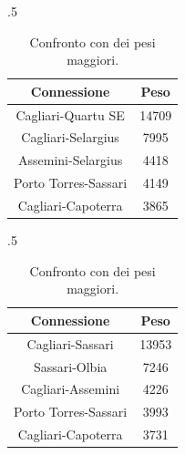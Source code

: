         \begin{table}[htb]
            \newcommand\dimTab{.5\linewidth}
            \newcommand\sepCol{\hspace{0.5em}}
            \newcommand\sepTab{\hspace{0em}}
            \centering
            \begin{subtable}{\dimTab}
                \centering
                \begin{tabular}{c@{\sepCol}c}
                    \hline
                    Connessione & Peso \\
                    \hline
                    Cagliari-Quartu SE & 14709 \\
                    Cagliari-Selargius & 7995 \\
                    Assemini-Selargius & 4418 \\
                    Porto Torres-Sassari & 4149 \\
                    Cagliari-Capoterra & 3865 \\
                    \hline
                \end{tabular}
                \caption{Pesi maggiori correnti.}
                \label{tabPesiCorrenti}
            \end{subtable}%
            \sepTab
            \begin{subtable}{\dimTab}
                \centering
                \begin{tabular}{c@{\sepCol}c}
                    \hline
                    Connessione & Peso \\
                    \hline
                    Cagliari-Sassari & 13953 \\
                    Sassari-Olbia & 7246 \\
                    Cagliari-Assemini & 4226 \\
                    Porto Torres-Sassari & 3993 \\
                    Cagliari-Capoterra & 3731 \\
                    \hline
                \end{tabular}
                \caption{Pesi maggiori di \cite{DeMontis2007}}
                \label{tabPesiDeMontis}
            \end{subtable}
            \caption{Confronto con \cite{DeMontis2007} dei pesi maggiori.}
            \label{tabConfrontoPesiDeMontis}
        \end{table}
       
